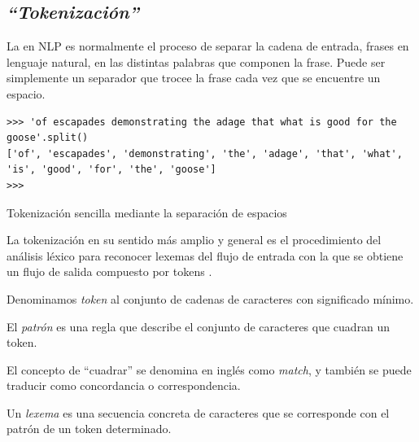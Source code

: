 \FloatBarrier
\subsection{\emph{``Tokenización''}}

La  en NLP es normalmente el proceso de separar la cadena de entrada, frases en lenguaje natural, en las distintas palabras que componen la frase. Puede ser simplemente un separador que trocee la frase cada vez que se encuentre un espacio.
\begin{listing}[H]
\begin{verbatim}
>>> 'of escapades demonstrating the adage that what is good for the goose'.split()
['of', 'escapades', 'demonstrating', 'the', 'adage', 'that', 'what', 'is', 'good', 'for', 'the', 'goose']
>>> 
\end{verbatim}
\caption{Tokenización sencilla mediante la separación de espacios}
\label{lst:tokenizacion-sencilla}
\end{listing}

La tokenización en su sentido más amplio y general es el procedimiento del análisis léxico para reconocer lexemas del flujo de entrada con la que se obtiene un flujo de salida compuesto por tokens \citep[§2.2]{Jimenez2004}.

\begin{definition}[Token] 
Denominamos \emph{token} al conjunto de cadenas de caracteres con significado mínimo.
\end{definition}

\begin{definition}[Patrón] 
El \emph{patrón} es una regla que describe el conjunto de caracteres que cuadran un token.
\end{definition}

El concepto de ``cuadrar'' se denomina en inglés como \emph{match}, y también se puede traducir como concordancia o correspondencia.

\begin{definition}[Lexema] 
Un \emph{lexema} es una secuencia concreta de caracteres que se corresponde con el patrón de un token determinado.
\end{definition}


